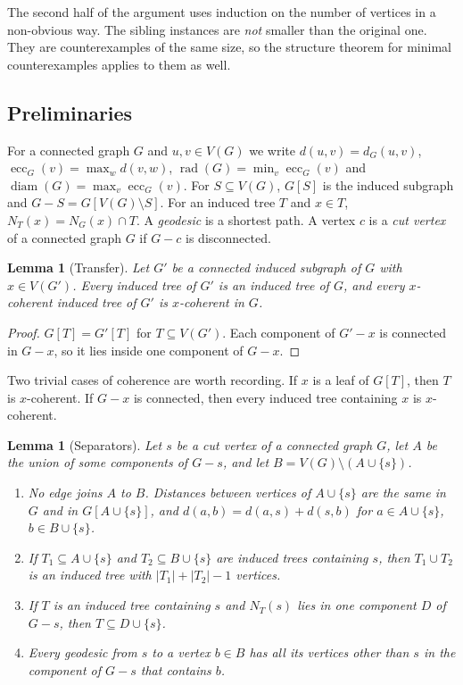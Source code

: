 \documentclass[11pt,a4paper]{article}
\newtheorem{lemma}[theorem]{Lemma}
\theoremstyle{remark}
\newcommand{\rad}{\operatorname{rad}}
\newcommand{\diam}{\operatorname{diam}}
\newcommand{\ecc}{\operatorname{ecc}}
\begin{document}
The second half of the argument uses induction on the number of vertices in a non-obvious way. The sibling instances are \emph{not} smaller than the original one. They are counterexamples of the same size, so the structure theorem for minimal counterexamples applies to them as well.

\subsection{Preliminaries}\label{sec:prelim}

For a connected graph $G$ and $u,v\in V(G)$ we write $d(u,v)=d_G(u,v)$, $\ecc_G(v)=\max_w d(v,w)$, $\rad(G)=\min_v\ecc_G(v)$ and $\diam(G)=\max_v\ecc_G(v)$. For $S\subseteq V(G)$, $G[S]$ is the induced subgraph and $G-S=G[V(G)\setminus S]$. For an induced tree $T$ and $x\in T$, $N_T(x)=N_G(x)\cap T$. A \emph{geodesic} is a shortest path. A vertex $c$ is a \emph{cut vertex} of a connected graph $G$ if $G-c$ is disconnected.

\begin{lemma}[Transfer]\label{lem:transfer}
Let $G'$ be a connected induced subgraph of $G$ with $x\in V(G')$. Every induced tree of $G'$ is an induced tree of $G$, and every $x$-coherent induced tree of $G'$ is $x$-coherent in $G$.
\end{lemma}

\begin{proof}
$G[T]=G'[T]$ for $T\subseteq V(G')$. Each component of $G'-x$ is connected in $G-x$, so it lies inside one component of $G-x$.
\end{proof}

Two trivial cases of coherence are worth recording. If $x$ is a leaf of $G[T]$, then $T$ is $x$-coherent. If $G-x$ is connected, then every induced tree containing $x$ is $x$-coherent.

\begin{lemma}[Separators]\label{lem:sep}
Let $s$ be a cut vertex of a connected graph $G$, let $A$ be the union of some components of $G-s$, and let $B=V(G)\setminus(A\cup\{s\})$.
\begin{enumerate}[label=\textup{(\alph*)}]
\item No edge joins $A$ to $B$. Distances between vertices of $A\cup\{s\}$ are the same in $G$ and in $G[A\cup\{s\}]$, and $d(a,b)=d(a,s)+d(s,b)$ for $a\in A\cup\{s\}$, $b\in B\cup\{s\}$.
\item If $T_1\subseteq A\cup\{s\}$ and $T_2\subseteq B\cup\{s\}$ are induced trees containing $s$, then $T_1\cup T_2$ is an induced tree with $|T_1|+|T_2|-1$ vertices.
\item If $T$ is an induced tree containing $s$ and $N_T(s)$ lies in one component $D$ of $G-s$, then $T\subseteq D\cup\{s\}$.
\item Every geodesic from $s$ to a vertex $b\in B$ has all its vertices other than $s$ in the component of $G-s$ that contains $b$.
\end{enumerate}
\end{lemma}
\end{document}
